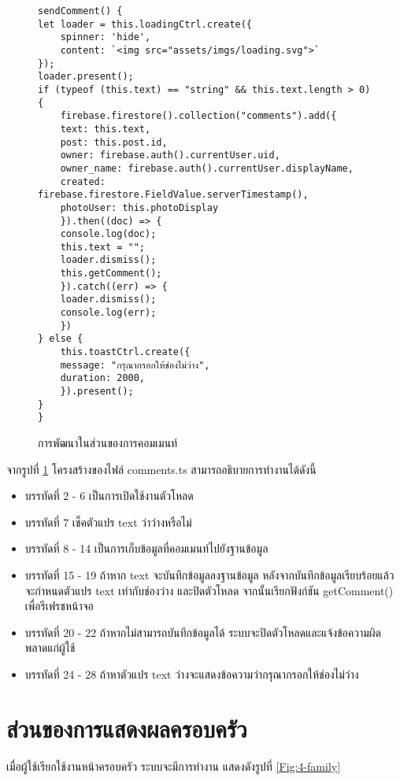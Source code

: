 \begin{figure}[H]
{\lstset{language=Pascal}
\begin{lstlisting}
sendComment() {
let loader = this.loadingCtrl.create({
	spinner: 'hide',
	content: `<img src="assets/imgs/loading.svg">`
});
loader.present();
if (typeof (this.text) == "string" && this.text.length > 0) {
	firebase.firestore().collection("comments").add({
	text: this.text,
	post: this.post.id,
	owner: firebase.auth().currentUser.uid,
	owner_name: firebase.auth().currentUser.displayName,
	created: firebase.firestore.FieldValue.serverTimestamp(),
	photoUser: this.photoDisplay
	}).then((doc) => {
	console.log(doc);
	this.text = "";
	loader.dismiss();
	this.getComment();
	}).catch((err) => {
	loader.dismiss();
	console.log(err);
	})
} else {
	this.toastCtrl.create({
	message: "กรุณากรอกให้ช่องไม่ว่าง",
	duration: 2000,
	}).present();
}
}
\end{lstlisting}}
\caption{การพัฒนาในส่วนของการคอมเมนท์}
\label{Fig:4-commentspost}
\end{figure}
\newpage

จากรูปที่ \ref{Fig:4-commentspost} โครงสร้างของไฟล์ comments.ts สามารถอธิบายการทำงานได้ดังนี้
\begin{itemize}[label={--}]
\item บรรทัดที่ 2 - 6 เป็นการเปิดใช้งานตัวโหลด
\item บรรทัดที่ 7 เช็คตัวแปร text ว่าว่างหรือไม่
\item บรรทัดที่ 8 - 14 เป็นการเก็บข้อมูลที่คอมเมนท์ไปยังฐานข้อมูล
\item บรรทัดที่ 15 - 19 ถ้าหาก text จะบันทึกข้อมูลลงฐานข้อมูล หลังจากบันทึกข้อมูลเรียบร้อยแล้ว จะกำหนดตัวแปร text เท่ากับช่องว่าง และปิดตัวโหลด จากนั้นเรียกฟังก์ชัน getComment() เพื่อรีเฟรชหน้าจอ
\item บรรทัดที่ 20 - 22 ถ้าหากไม่สามารถบันทึกข้อมูลได้ ระบบจะปิดตัวโหลดและแจ้งข้อความผิดพลาดแก่ผู้ใช้
\item บรรทัดที่ 24 - 28 ถ้าหาตัวแปร text ว่างจะแสดงข้อความว่ากรุณากรอกให้ช่องไม่ว่าง
\end{itemize}
\newpage



\section{ส่วนของการแสดงผลครอบครัว}
เมื่อผู้ใช้เรียกใช้งานหน้าครอบครัว ระบบจะมีการทำงาน แสดงดังรูปที่ \ref{Fig:4-family}

